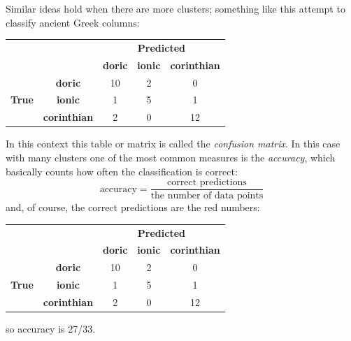 \documentclass[12pt]{article}
\begin{document}
Similar ideas hold when there are more clusters; something like this
attempt to classify ancient Greek columns:
\begin{center}
\begin{tabular}{|c|c|c|c|c|}
\cline{3-5}
\multicolumn{1}{c}{}&\multicolumn{1}{c|}{}&\multicolumn{3}{c|}{\textbf{Predicted}} \\ \cline{3-5} 
\multicolumn{1}{c}{}&\multicolumn{1}{c|}{}& \textbf{doric} & \textbf{ionic} & \textbf{corinthian} \\ \hline
\multirow{3}{*}{\textbf{True}}&
\textbf{doric} & 10 & 2 & 0 \\ \cline{2-5}
&\textbf{ionic} & 1 & 5 & 1 \\ \cline{2-5}
&\textbf{corinthian} & 2 & 0 & 12 \\ \cline{1-5}
\end{tabular}
\end{center}
In this context this table or matrix is called the \textsl{confusion
  matrix}. In this case with many clusters one of the most common measures is the \textsl{accuracy}, which basically counts how often the classification is correct:
\begin{equation}
  \mbox{accuracy}=\frac{\mbox{correct predictions}}{\mbox{the number of data points}}
\end{equation}
and, of course, the correct predictions are the red numbers:
\begin{center}
\begin{tabular}{|c|c|c|c|c|}
\cline{3-5}
\multicolumn{1}{c}{}&\multicolumn{1}{c|}{}&\multicolumn{3}{c|}{\textbf{Predicted}} \\ \cline{3-5} 
\multicolumn{1}{c}{}&\multicolumn{1}{c|}{}& \textbf{doric} & \textbf{ionic} & \textbf{corinthian} \\ \hline
\multirow{3}{*}{\textbf{True}}&
\textbf{doric} & \color{red}10 & 2 & 0 \\ \cline{2-5}
&\textbf{ionic} & 1 & \color{red}5 & 1 \\ \cline{2-5}
&\textbf{corinthian} & 2 & 0 & \color{red}12 \\ \cline{1-5}
\end{tabular}
\end{center}
so accuracy is 27/33.
\end{document}
